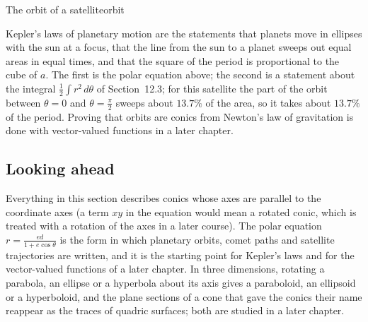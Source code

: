\documentclass[11pt]{article}
\begin{document}
\begin{exmp}{The orbit of a satellite}{orbit}
\begin{center}
\end{center}
Kepler's laws of planetary motion are the statements that planets move in ellipses with the sun at a focus, that the line from the sun to a planet sweeps out equal areas in equal times, and that the square of the period is proportional to the cube of $a$. The first is the polar equation above; the second is a statement about the integral $\frac12\int r^2\,d\theta$ of Section~12.3; for this satellite the part of the orbit between $\theta=0$ and $\theta=\frac\pi2$ sweeps about $13.7\%$ of the area, so it takes about $13.7\%$ of the period. Proving that orbits are conics from Newton's law of gravitation is done with vector-valued functions in a later chapter.
\end{exmp}

\subsection*{Looking ahead}

Everything in this section describes conics whose axes are parallel to the coordinate axes (a term $xy$ in the equation would mean a rotated conic, which is treated with a rotation of the axes in a later course). The polar equation $r=\frac{ed}{1+e\cos\theta}$ is the form in which planetary orbits, comet paths and satellite trajectories are written, and it is the starting point for Kepler's laws and for the vector-valued functions of a later chapter. In three dimensions, rotating a parabola, an ellipse or a hyperbola about its axis gives a paraboloid, an ellipsoid or a hyperboloid, and the plane sections of a cone that gave the conics their name reappear as the traces of quadric surfaces; both are studied in a later chapter.
\end{document}
